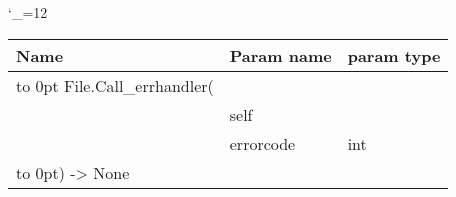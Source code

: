 \begingroup \catcode`\_=12 \tt
\begin{tabular}{lll}
\toprule
\textrm{Name}&\textrm{Param name}&\textrm{param type}\\
\midrule
\hbox to 0pt {File.Call_errhandler(\hss}\\
& self\\
& errorcode & int\\
\hbox to 0pt{) -> None\hss}\\
\bottomrule
\end{tabular}
\endgroup
